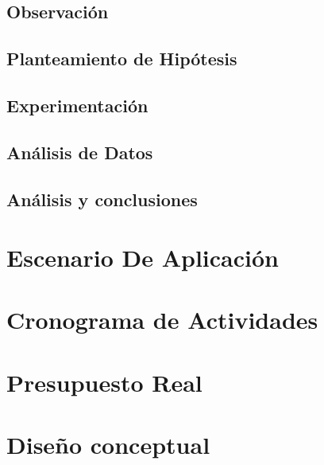 \documentclass{extbook}
\begin{document}
\subsection{Observación}

\subsection{Planteamiento de Hipótesis}

\subsection{Experimentación}

\subsection{Análisis de Datos}

\subsection{Análisis y conclusiones}

\section{Escenario De Aplicación}

\section{Cronograma de Actividades}

\section{Presupuesto Real}

\section{Diseño conceptual}


\end{document}
